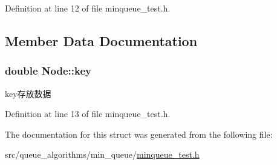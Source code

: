 Definition at line 12 of file minqueue\+\_\+test.\+h.



\subsection{Member Data Documentation}
\hypertarget{struct_node_afcabbedc2b739455060451607c6344e4}{}
\subsubsection[{key}]{\setlength{\rightskip}{0pt plus 5cm}double Node\+::key}\label{struct_node_afcabbedc2b739455060451607c6344e4}
key存放数据 

Definition at line 13 of file minqueue\+\_\+test.\+h.



The documentation for this struct was generated from the following file\+:\begin{DoxyCompactItemize}
\item 
src/queue\+\_\+algorithms/min\+\_\+queue/\hyperlink{minqueue__test_8h}{minqueue\+\_\+test.\+h}\end{DoxyCompactItemize}
